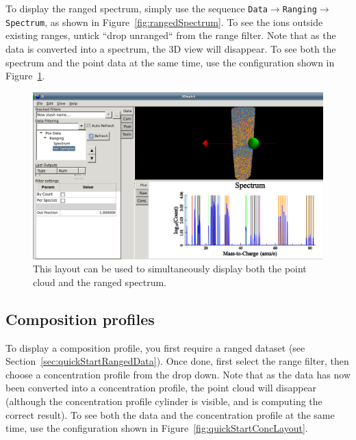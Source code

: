 \documentclass[10pt]{article}
\begin{document}
To display the ranged spectrum, simply use the sequence \texttt{Data$\rightarrow$Ranging$\rightarrow$Spectrum}, as shown in Figure~\ref{fig:rangedSpectrum}. To see the ions outside existing ranges, untick ``drop unranged`` from the range filter. Note that as the data is converted into a spectrum, the 3D view will disappear. To see both the spectrum and the point data at the same time, use the configuration shown in Figure~\ref{fig:rangedSpectrumWithCloud}.

\begin{figure}[h]
\centering
 \includegraphics[width=0.85 \textwidth,keepaspectratio=true]{./figures/rangedSpectrumCloud.png}

 \caption{This layout can be used to simultaneously display both the point cloud and the ranged spectrum.}
\label{fig:rangedSpectrumWithCloud}
\end{figure}


\subsection{Composition profiles}
To display a composition profile, you first require a ranged dataset (see Section~\ref{sec:quickStartRangedData}). Once done, first select the range filter, then choose a concentration profile from the drop down. Note that as the data has now been converted into a concentration profile, the point cloud will disappear (although the concentration profile cylinder is visible, and is computing the correct result). To see both the data and the concentration profile at the same time, use the configuration shown in Figure~\ref{fig:quickStartConcLayout}.
\end{document}

